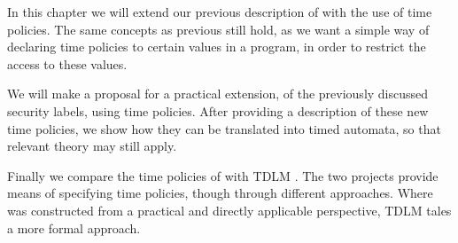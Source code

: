
In this chapter we will extend our previous description of \thelang{} with the use of time policies.
The same concepts as previous still hold, as we want a simple way of declaring time policies to certain values in a program, in order to restrict the access to these values.

We will make a proposal for a practical extension, of the previously discussed security labels, using time policies.
After providing a description of these new time policies, we show how they can be translated into timed automata, so that relevant theory may still apply.

Finally we compare the time policies of \thelang{} with TDLM \cite{pedersen2015}.
The two projects provide means of specifying time policies, though through different approaches.
Where \thelang{} was constructed from a practical and directly applicable perspective, TDLM tales a more formal approach.
